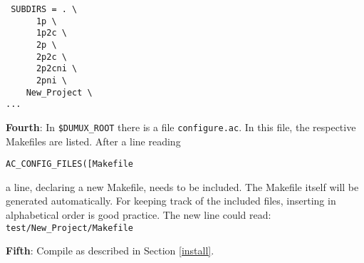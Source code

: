\begin{verbatim}
 SUBDIRS = . \
	  1p \
	  1p2c \
	  2p \
	  2p2c \
	  2p2cni \
	  2pni \
	New_Project \
...
\end{verbatim}

\textbf{Fourth}: In \verb+$DUMUX_ROOT+ there is a file \verb+configure.ac+. In this file, the respective Makefiles are listed. After a line reading

 \verb+AC_CONFIG_FILES([Makefile+ 

 \noindent a line, declaring a new Makefile, needs to be included. The Makefile itself will be generated automatically. For keeping track of the included files, inserting in alphabetical order is good practice. The new line could read: \verb+test/New_Project/Makefile+ 

\textbf{Fifth}: Compile \Dumux as described in Section \ref{install}.





